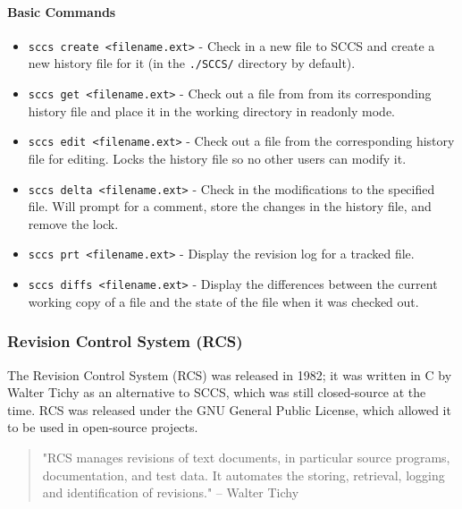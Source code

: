 \paragraph{Basic Commands}

\begin{itemize}
    \item \lstinline{sccs create <filename.ext>} - Check in a new file to SCCS and create a new history file for it (in the \lstinline{./SCCS/} directory by default).
    \item \lstinline{sccs get <filename.ext>} - Check out a file from from its corresponding history file and place it in the working directory in readonly mode.
    \item \lstinline{sccs edit <filename.ext>} - Check out a file from the corresponding history file for editing. Locks the history file so no other users can modify it.
    \item \lstinline{sccs delta <filename.ext>} - Check in the modifications to the specified file. Will prompt for a comment, store the changes in the history file, and remove the lock.
    \item \lstinline{sccs prt <filename.ext>} - Display the revision log for a tracked file.
    \item \lstinline{sccs diffs <filename.ext>} - Display the differences between the current working copy of a file and the state of the file when it was checked out.
\end{itemize}

\subsubsection{Revision Control System (RCS)}
The Revision Control System (RCS) was released in 1982; it was written in C by Walter Tichy as an alternative to SCCS, which was still closed-source at the time. RCS was released under the GNU General Public License, which allowed it to be used in open-source projects.

\begin{quote}
    "RCS manages revisions of text documents, in particular source programs, documentation, and test data. It automates the storing, retrieval, logging and identification of revisions." -- Walter Tichy \cite{tichy_1985}
\end{quote}

